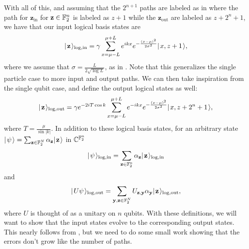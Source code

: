 \documentclass[../thesis-main/thesis-main]{subfiles}
\begin{document}
With all of this, and assuming that the $2^{n+1}$ paths are labeled as in  where the path for $\mathbf{z}_{\text{in}}$ for $\mathbf{z}\in \mathbb{F}_2^n$ is labeled as $z+1$ while the $\mathbf{z}_{\text{out}}$ are labeled as $z+2^n+1$, we have that our input logical basis states are
\begin{align}
  |\mspace{2mu} \mathbf{z} \mspace{2mu} \rangle_{\text{log},\text{in}} = \gamma \sum_{x = \mu - L}^{\mu + L} e^{ i k x} e^{ - \frac{(x-\mu)^2}{2\sigma^2}} |\mspace{2mu} x,z+1 \mspace{2mu} \rangle,
  \label{eq:multi_qubit_input_encoding}
\end{align}
where we assume that $\sigma = \frac{L}{2\sqrt{\log L}}$, as in .  Note that this generalizes the single particle case  to more input and output paths.  We can then take inspiration from the single qubit case, and define the output logical states as well:
 \begin{align}
  |\mspace{2mu} \mathbf{z} \mspace{2mu} \rangle_{\text{log},\text{out}} = \gamma e^{- 2 i T \cos k} \sum_{x = \mu - L}^{\mu + L} e^{ -i k x} e^{ - \frac{(x-\mu)^2}{2\sigma^2}} |\mspace{2mu} x,z+2^n + 1 \mspace{2mu} \rangle,
  \label{eq:multi_qubit_output_encoding}
\end{align}
where $T = \frac{\mu}{\sin |k|}$.  In addition to these logical basis states, for an arbitrary state $|\mspace{2mu} \psi \mspace{2mu} \rangle = \sum_{\mathbf{z}\in \mathbb{F}_2^N} \alpha_{\mathbf{z}} |\mspace{2mu} \mathbf{z} \mspace{2mu} \rangle$ in $\mathbb{C}^{\mathbb{F}_2^n}$
\begin{align}
  |\mspace{2mu} \psi \mspace{2mu} \rangle_{\text{log},\text{in}} = \sum_{\mathbf{z}\in \mathbb{F}_2^n} \alpha_{\mathbf{z}} |\mspace{2mu} \mathbf{z} \mspace{2mu} \rangle_{\text{log},\text{in}}
\end{align} 
and
\begin{align}
  |\mspace{2mu} U \psi \mspace{2mu} \rangle_{\text{log},\text{out}} = \sum_{\mathbf{y},\mathbf{z}\in\mathbb{F}_2^N} U_{\mathbf{z},\mathbf{y}} \alpha_{\mathbf{y}}|\mspace{2mu} \mathbf{z} \mspace{2mu} \rangle_{\text{log},\text{out}},
\end{align}
where $U$ is thought of as a unitary on $n$ qubits.  With these definitions, we will want to show that the input states evolve to the corresponding output states.  This nearly follows from , but we need to do some small work showing that the errors don't grow like the number of paths.
\end{document}
